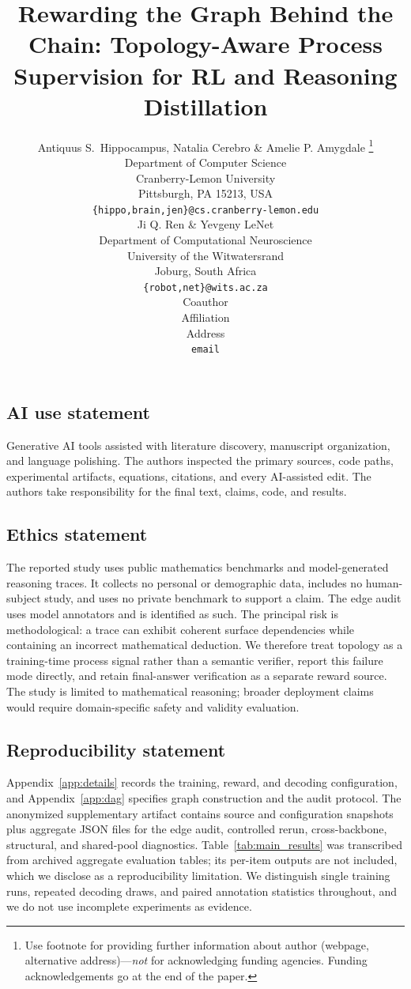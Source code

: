 \documentclass{article} %
\title{Rewarding the Graph Behind the Chain: Topology-Aware Process Supervision for RL and Reasoning Distillation}
\author{Antiquus S.~Hippocampus, Natalia Cerebro \& Amelie P. Amygdale \thanks{ Use footnote for providing further information
about author (webpage, alternative address)---\emph{not} for acknowledging
funding agencies.  Funding acknowledgements go at the end of the paper.} \\
Department of Computer Science\\
Cranberry-Lemon University\\
Pittsburgh, PA 15213, USA \\
\texttt{\{hippo,brain,jen\}@cs.cranberry-lemon.edu} \\
\And
Ji Q. Ren \& Yevgeny LeNet \\
Department of Computational Neuroscience \\
University of the Witwatersrand \\
Joburg, South Africa \\
\texttt{\{robot,net\}@wits.ac.za} \\
\AND
Coauthor \\
Affiliation \\
Address \\
\texttt{email}
}
\begin{document}
\maketitle








\subsection*{AI use statement}
Generative AI tools assisted with literature discovery, manuscript organization, and language polishing.
The authors inspected the primary sources, code paths, experimental artifacts, equations, citations, and every AI-assisted edit. The authors take responsibility for the final text, claims, code, and results.

\subsection*{Ethics statement}
The reported study uses public mathematics benchmarks and model-generated reasoning traces. It collects no personal or demographic data, includes no human-subject study, and uses no private benchmark to support a claim. The edge audit uses model annotators and is identified as such. The principal risk is methodological: a trace can exhibit coherent surface dependencies while containing an incorrect mathematical deduction. We therefore treat topology as a training-time process signal rather than a semantic verifier, report this failure mode directly, and retain final-answer verification as a separate reward source. The study is limited to mathematical reasoning; broader deployment claims would require domain-specific safety and validity evaluation.

\subsection*{Reproducibility statement}
Appendix~\ref{app:details} records the training, reward, and decoding configuration, and Appendix~\ref{app:dag} specifies graph construction and the audit protocol. The anonymized supplementary artifact contains source and configuration snapshots plus aggregate JSON files for the edge audit, controlled rerun, cross-backbone, structural, and shared-pool diagnostics. Table~\ref{tab:main_results} was transcribed from archived aggregate evaluation tables; its per-item outputs are not included, which we disclose as a reproducibility limitation. We distinguish single training runs, repeated decoding draws, and paired annotation statistics throughout, and we do not use incomplete experiments as evidence.
\end{document}

